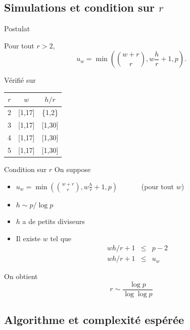 \documentclass[]{beamer}
\begin{document}
\subsection{Simulations et condition sur $r$}
\begin{frame}{Postulat}

\begin{postulate}
Pour tout $r > 2$,
$$ u_w = \min \left( \binom{w+r}{r}, w\frac{h}{r} + 1 , p \right).$$
\end{postulate}
Vérifié sur
\begin{center}
\begin{tabular}{|c|c|c|}
\hline
$r$ & $w$ 	& $h/r$ \\
\hline
2	& [1,17]	& \{1,2\}	\\
\hline
3	& [1,17]	& [1,30] \\
\hline
4	& [1,17]	& [1,30] \\
\hline
5	& [1,17]	& [1,30] \\
\hline
\end{tabular}
\end{center}
\end{frame}


\begin{frame}{Condition sur $r$}
On suppose
\begin{itemize}
\item $u_w = \min \left( \binom{w+r}{r}, w\frac{h}{r} + 1 , p \right)$  \ \ \ \ \ \ (pour tout $w$)
\item $h \sim p / \log p$
\item $h$ a de petits diviseurs
\item Il existe $w$ tel que
\begin{eqnarray*}
wh/r+1 &\leq & p-2 \\
wh/r+1 &\leq & u_w 
\end{eqnarray*}
\end{itemize} 
On obtient
$$ r \sim \frac{\log p}{\log \log p} $$
\end{frame}


\subsection{Algorithme et complexité espérée}
\end{document}
